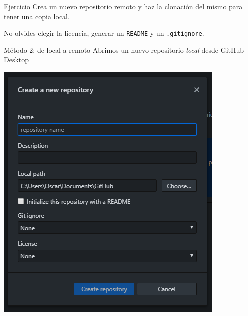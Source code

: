 \documentclass[aspectratio=169, xcolor={usenames,svgnames,dvipsnames}]{beamer}
\begin{document}
\begin{frame}[label={sec:orga281e09},fragile]{}
 \begin{block}{Ejercicio}
Crea un nuevo repositorio remoto y haz la clonación del mismo para tener una copia local.

No olvides elegir la licencia, generar un \texttt{README} y un \texttt{.gitignore}.
\end{block}
\end{frame}
\begin{frame}[label={sec:orgf5a5a99}]{Método 2: de local a remoto}
Abrimos un nuevo repositorio \emph{local} desde GitHub Desktop

\begin{center}
\end{center}

\begin{center}
\includegraphics[height=0.7\textheight]{figs/Desktop_NewRepository.png}
\end{center}
\end{frame}
\end{document}
